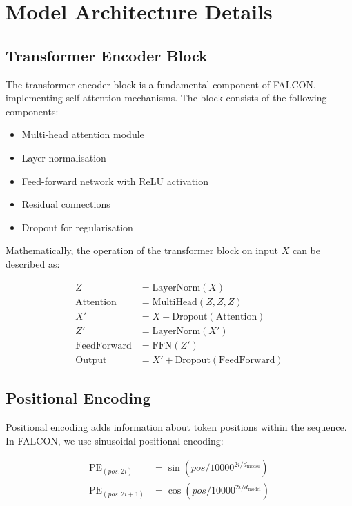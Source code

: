 \documentclass[conference]{IEEEtran}
\begin{document}
\appendix

\section{Model Architecture Details}

\subsection{Transformer Encoder Block}
The transformer encoder block is a fundamental component of FALCON, implementing self-attention mechanisms. The block consists of the following components:

\begin{itemize}
\item Multi-head attention module
\item Layer normalisation
\item Feed-forward network with ReLU activation
\item Residual connections
\item Dropout for regularisation
\end{itemize}

Mathematically, the operation of the transformer block on input $X$ can be described as:

\begin{align}
Z &= \text{LayerNorm}(X) \\
\text{Attention} &= \text{MultiHead}(Z, Z, Z) \\
X' &= X + \text{Dropout}(\text{Attention}) \\
Z' &= \text{LayerNorm}(X') \\
\text{FeedForward} &= \text{FFN}(Z') \\
\text{Output} &= X' + \text{Dropout}(\text{FeedForward})
\end{align}

\subsection{Positional Encoding}
Positional encoding adds information about token positions within the sequence. In FALCON, we use sinusoidal positional encoding:

\begin{align}
\text{PE}_{(pos, 2i)} &= \sin(pos / 10000^{2i/d_{\text{model}}}) \\
\text{PE}_{(pos, 2i+1)} &= \cos(pos / 10000^{2i/d_{\text{model}}})
\end{align}
\end{document}
